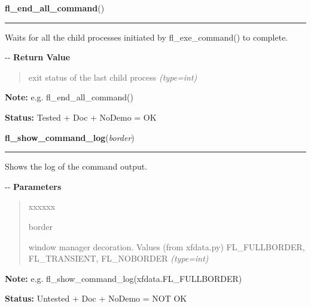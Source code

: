 \hspace{.8\funcindent}\begin{boxedminipage}{\funcwidth}

    \raggedright \textbf{fl\_end\_all\_command}()

    \vspace{-1.5ex}

    \rule{\textwidth}{0.5\fboxrule}
\setlength{\parskip}{2ex}

Waits for all the child processes initiated by fl\_exe\_command()
to complete.

-{}-
\setlength{\parskip}{1ex}
      \textbf{Return Value}
    \vspace{-1ex}

      \begin{quote}

exit status of the last child process
      {\it (type=int)}

      \end{quote}

\textbf{Note:} 
e.g. fl\_end\_all\_command()


\textbf{Status:} 
Tested + Doc + NoDemo = OK


    \end{boxedminipage}

    \label{xformslib:flgoodies:fl_show_command_log}

    \vspace{0.5ex}

\hspace{.8\funcindent}\begin{boxedminipage}{\funcwidth}

    \raggedright \textbf{fl\_show\_command\_log}(\textit{border})

    \vspace{-1.5ex}

    \rule{\textwidth}{0.5\fboxrule}
\setlength{\parskip}{2ex}

Shows the log of the command output.

-{}-
\setlength{\parskip}{1ex}
      \textbf{Parameters}
      \vspace{-1ex}

      \begin{quote}
        \begin{Ventry}{xxxxxx}

          \item[border]


window manager decoration. Values (from xfdata.py) FL\_FULLBORDER,
FL\_TRANSIENT, FL\_NOBORDER
            {\it (type=int)}

        \end{Ventry}

      \end{quote}

\textbf{Note:} 
e.g. fl\_show\_command\_log(xfdata.FL\_FULLBORDER)


\textbf{Status:} 
Untested + Doc + NoDemo = NOT OK


    \end{boxedminipage}

